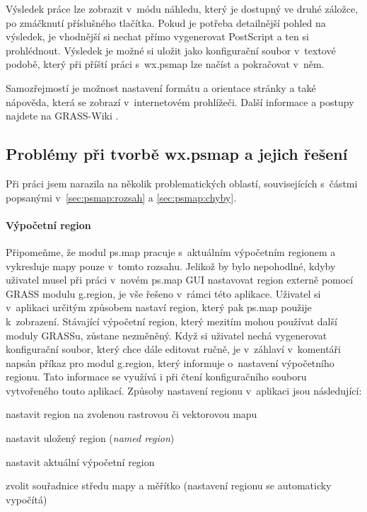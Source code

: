 \documentclass[a4paper,12pt,draft]{article}
\begin{document}
Výsledek práce lze zobrazit v~módu náhledu, který je dostupný ve
druhé záložce, po zmáčknutí příslušného tlačítka. Pokud je
potřeba detailnější pohled na výsledek, je vhodnější si nechat přímo
vygenerovat PostScript a ten si prohlédnout. Výsledek je možné si uložit
jako konfigurační soubor v~textové podobě, který při příští práci
s~wx.psmap lze načíst a pokračovat v~něm.

Samozřejmostí je možnost nastavení formátu a orientace stránky a
také nápo\-věda, která se zobrazí v~internetovém prohlížeči. Další
informace a postupy najdete na GRASS-Wiki \cite{wiki_wxpsmap}. 


\subsection[Problémy při tvorbě wx.psmap]{Problémy při tvorbě wx.psmap
a jejich řešení}
\label{sec:gui:problemy}
Při práci jsem narazila na několik problematických oblastí,
 souvisejících s~částmi popsanými v~\ref{sec:psmap:rozsah} a
\ref{sec:psmap:chyby}.

\paragraph*{Výpočetní region} Připomeňme, že modul ps.map
pracuje s~aktuálním výpočet\-ním regionem a vykresluje mapy pouze v~tomto
rozsahu. Jelikož by bylo nepohodlné, kdyby uživatel musel při práci
v~novém ps.map GUI nastavovat region externě pomocí GRASS modulu
g.region, je vše řešeno v~rámci této aplikace. Uživatel si
v~aplikaci určitým způsobem nastaví region, který pak ps.map
použije k~zobrazení. Stávající výpočetní region, který mezitím
mohou používat další moduly GRASSu, zůstane nezměněný. Když si
uživatel nechá vygenerovat konfigurační soubor, který chce dále
editovat ručně, je v~záhlaví v~komentáři napsán příkaz pro modul
g.region, který informuje o~nastavení výpočetního regionu.
 Tato informace se využívá i při čtení konfiguračního
souboru vytvořeného touto aplikací.  Způsoby nastavení regionu v~aplikaci jsou
následující:
\begin{enumerate*}
    \item nastavit region na zvolenou rastrovou či vektorovou mapu
    \item nastavit uložený region (\emph{named region})
    \item nastavit aktuální výpočetní region
    \item zvolit souřadnice středu mapy a měřítko (nastavení regionu
    se automaticky vypočítá)
\end{enumerate*}
\end{document}
